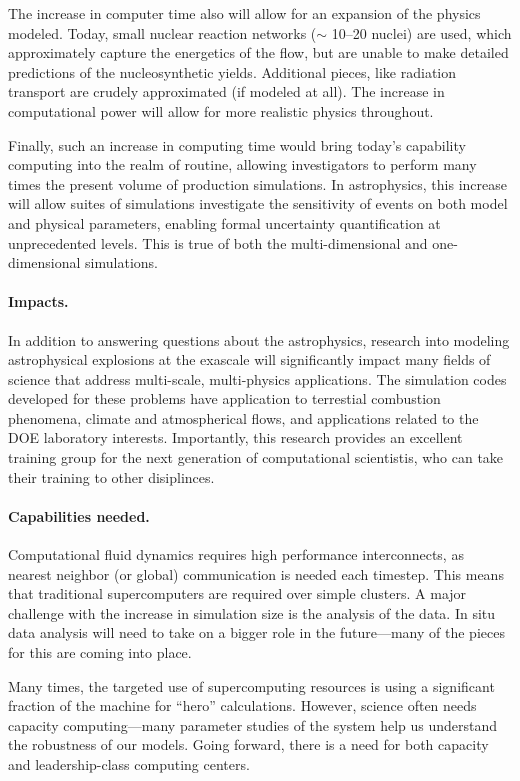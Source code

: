 \documentclass[11pt,twocolumn]{article}
\begin{document}
The increase in computer time also will allow for an expansion of the
physics modeled.  Today, small nuclear reaction networks ($\sim$
10--20 nuclei) are used, which approximately capture the energetics of
the flow, but are unable to make detailed predictions of the
nucleosynthetic yields.  Additional pieces, like radiation transport
are crudely approximated (if modeled at all).  The increase in
computational power will allow for more realistic physics throughout.

Finally, such an increase in computing time would bring today's
capability computing into the realm of routine, allowing investigators
to perform many times the present volume of production simulations.
In astrophysics, this increase will allow suites of simulations 
investigate the sensitivity of events on both model and physical
parameters, enabling formal uncertainty quantification at 
unprecedented levels.  This is true of both the multi-dimensional
and one-dimensional simulations.

\paragraph*{Impacts.} In addition to answering questions about the 
astrophysics, research into modeling astrophysical explosions at the
exascale will significantly impact many fields of science that address
multi-scale, multi-physics applications.  The simulation codes
developed for these problems have application to terrestial combustion
phenomena, climate and atmospherical flows, and applications related
to the DOE laboratory interests.  Importantly, this research provides
an excellent training group for the next generation of computational
scientistis, who can take their training to other disiplinces.


\paragraph*{Capabilities needed.}  Computational fluid dynamics requires 
high performance interconnects, as nearest neighbor (or global)
communication is needed each timestep.  This means that traditional
supercomputers are required over simple clusters.  A major challenge
with the increase in simulation size is the analysis of the data.  In
situ data analysis will need to take on a bigger role in the future---many
of the pieces for this are coming into place.

Many times, the targeted use of supercomputing resources is using a
significant fraction of the machine for ``hero'' calculations.
However, science often needs capacity computing---many parameter
studies of the system help us understand the robustness of our models.
Going forward, there is a need for both capacity and leadership-class
computing centers.
\end{document}
